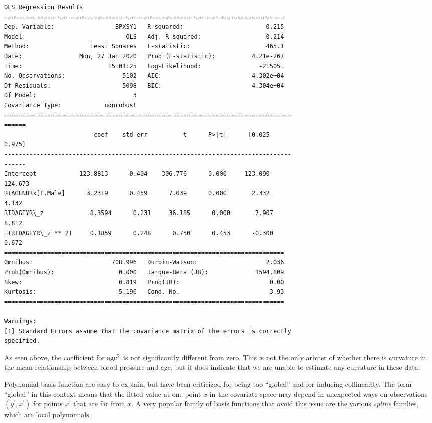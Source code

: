 \documentclass[11pt]{article}
\begin{document}
    \begin{Verbatim}[commandchars=\\\{\}]
                            OLS Regression Results
==============================================================================
Dep. Variable:                 BPXSY1   R-squared:                       0.215
Model:                            OLS   Adj. R-squared:                  0.214
Method:                 Least Squares   F-statistic:                     465.1
Date:                Mon, 27 Jan 2020   Prob (F-statistic):          4.21e-267
Time:                        15:01:25   Log-Likelihood:                -21505.
No. Observations:                5102   AIC:                         4.302e+04
Df Residuals:                    5098   BIC:                         4.304e+04
Df Model:                           3
Covariance Type:            nonrobust
================================================================================
======
                         coef    std err          t      P>|t|      [0.025
0.975]
--------------------------------------------------------------------------------
------
Intercept            123.8813      0.404    306.776      0.000     123.090
124.673
RIAGENDRx[T.Male]      3.2319      0.459      7.039      0.000       2.332
4.132
RIDAGEYR\_z             8.3594      0.231     36.185      0.000       7.907
8.812
I(RIDAGEYR\_z ** 2)     0.1859      0.248      0.750      0.453      -0.300
0.672
==============================================================================
Omnibus:                      708.996   Durbin-Watson:                   2.036
Prob(Omnibus):                  0.000   Jarque-Bera (JB):             1594.809
Skew:                           0.819   Prob(JB):                         0.00
Kurtosis:                       5.196   Cond. No.                         3.93
==============================================================================

Warnings:
[1] Standard Errors assume that the covariance matrix of the errors is correctly
specified.
\end{Verbatim}

    As seen above, the coefficient for \({\rm age}^2\) is not significantly
different from zero. This is not the only arbiter of whether there is
curvature in the mean relationship between blood pressure and age, but
it does indicate that we are unable to estimate any curvature in these
data.

    Polynomial basis function are easy to explain, but have been criticized
for being too ``global'' and for inducing collinearity. The term
``global'' in this context means that the fitted value at one point
\(x\) in the covariate space may depend in unexpected ways on
observations \((y^\prime, x^\prime)\) for points \(x^\prime\) that are
far from \(x\). A very popular family of basis functions that avoid this
issue are the various \emph{spline} families, which are local
polynomials.
\end{document}
